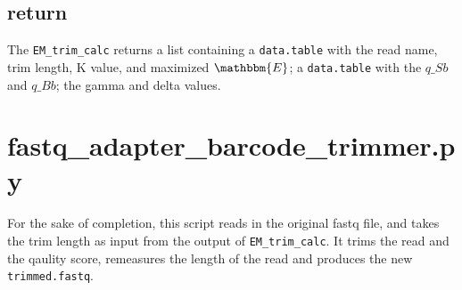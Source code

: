 \documentclass[12pt]{article}
\begin{document}
  \subsection*{return}
The \texttt{EM\_trim\_calc} returns a list containing a \texttt{data.table} with the read name, trim length, K value, and maximized $\mathbbm{E}$; a \texttt{data.table} with the $q\_Sb$ and $q\_Bb$; the gamma and delta values.

\section*{fastq\_adapter\_barcode\_trimmer.py}
For the sake of completion, this script reads in the original fastq file, and takes the trim length as input from the output of \texttt{EM\_trim\_calc}. It trims the read and the qaulity score, remeasures the length of the read and produces the new \texttt{trimmed.fastq}.\\\\
\end{document}

